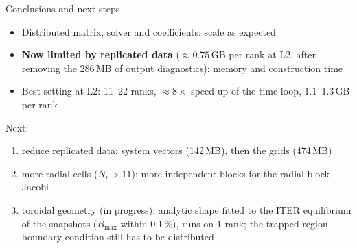 \begin{frame}{Conclusions and next steps}
    \begin{itemize}
        \item Distributed matrix, solver and coefficients: scale as expected
        \item \textbf{Now limited by replicated data} ($\approx 0.75$\,GB per rank at L2,
              after removing the 286\,MB of output diagnostics): memory and construction time
        \item Best setting at L2: 11--22 ranks, $\approx 8\times$ speed-up of the time loop,
              1.1--1.3\,GB per rank
    \end{itemize}
    \vspace{0.5em}
    Next:
    \begin{enumerate}
        \item reduce replicated data: system vectors (142\,MB),
              then the grids (474\,MB)
        \item more radial cells ($N_r > 11$): more independent blocks for the radial block Jacobi
        \item toroidal geometry (in progress): analytic shape fitted to the ITER equilibrium
              of the snapshots ($B_\mathrm{max}$ within 0.1\,\%), runs on 1 rank;
              the trapped-region boundary condition still has to be distributed
    \end{enumerate}
\end{frame}
